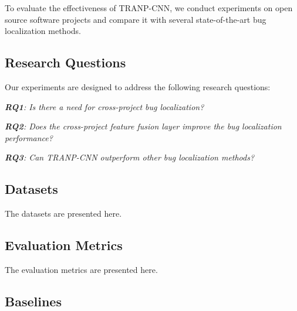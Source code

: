 To evaluate the effectiveness of TRANP-CNN, we conduct experiments on open source software projects and compare it with several state-of-the-art bug localization methods.

\subsection{Research Questions}


Our experiments are designed to address the following research questions:

\textit{\textbf{RQ1}: Is there a need for cross-project bug localization?}

\textit{\textbf{RQ2}: Does the cross-project feature fusion layer improve the bug localization performance?}

\textit{\textbf{RQ3}: Can TRANP-CNN outperform other bug localization methods?}

\subsection{Datasets}
The datasets are presented here.



\subsection{Evaluation Metrics}
The evaluation metrics are presented here.



\subsection{Baselines}

